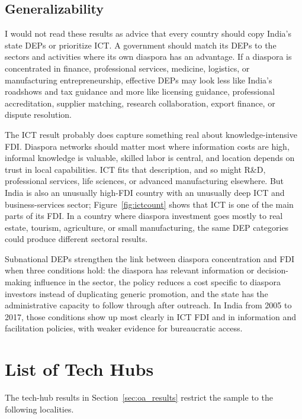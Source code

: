 \documentclass[12pt]{article}
\let\oldsection\section
\renewcommand{\section}{\FloatBarrier\oldsection}
\let\oldsubsection\subsection
\renewcommand{\subsection}{\FloatBarrier\oldsubsection}
\begin{document}
\subsection{Generalizability}

I would not read these results as advice that every country should copy India's state DEPs or prioritize ICT. A government should match its DEPs to the sectors and activities where its own diaspora has an advantage. If a diaspora is concentrated in finance, professional services, medicine, logistics, or manufacturing entrepreneurship, effective DEPs may look less like India's roadshows and tax guidance and more like licensing guidance, professional accreditation, supplier matching, research collaboration, export finance, or dispute resolution.

The ICT result probably does capture something real about knowledge-intensive FDI. Diaspora networks should matter most where information costs are high, informal knowledge is valuable, skilled labor is central, and location depends on trust in local capabilities. ICT fits that description, and so might R\&D, professional services, life sciences, or advanced manufacturing elsewhere. But India is also an unusually high-FDI country with an unusually deep ICT and business-services sector; Figure~\ref{fig:ictcount} shows that ICT is one of the main parts of its FDI. In a country where diaspora investment goes mostly to real estate, tourism, agriculture, or small manufacturing, the same DEP categories could produce different sectoral results.

Subnational DEPs strengthen the link between diaspora concentration and FDI when three conditions hold: the diaspora has relevant information or decision-making influence in the sector, the policy reduces a cost specific to diaspora investors instead of duplicating generic promotion, and the state has the administrative capacity to follow through after outreach. In India from 2005 to 2017, those conditions show up most clearly in ICT FDI and in information and facilitation policies, with weaker evidence for bureaucratic access.

\section{List of Tech Hubs} \label{sec:oa_techhubs}

The tech-hub results in Section~\ref{sec:oa_results} restrict the sample to the following localities.
\end{document}

